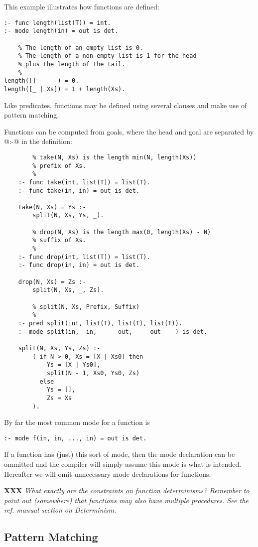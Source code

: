\documentclass[a4paper,11pt,notitlepage,onecolumn]{article}
\newcommand{\XXX}[1]%
{{\small\textbf{XXX} \emph{#1}}}
\begin{document}
This example illustrates how functions are defined:
\begin{verbatim}
:- func length(list(T)) = int.
:- mode length(in) = out is det.

    % The length of an empty list is 0.
    % The length of a non-empty list is 1 for the head
    % plus the length of the tail.
    %
length([]      ) = 0.
length([_ | Xs]) = 1 + length(Xs).
\end{verbatim}
Like predicates, functions may be defined using several clauses
and make use of pattern matching.

Functions can be computed from goals, where the head and goal
are separated by @:-@ in the definition:
\begin{verbatim}
        % take(N, Xs) is the length min(N, length(Xs))
        % prefix of Xs.
        %
    :- func take(int, list(T)) = list(T).
    :- func take(in, in) = out is det.

    take(N, Xs) = Ys :-
        split(N, Xs, Ys, _).

        % drop(N, Xs) is the length max(0, length(Xs) - N)
        % suffix of Xs.
        %
    :- func drop(int, list(T)) = list(T).
    :- func drop(in, in) = out is det.

    drop(N, Xs) = Zs :-
        split(N, Xs, _, Zs).

        % split(N, Xs, Prefix, Suffix)
        %
    :- pred split(int, list(T), list(T), list(T)).
    :- mode split(in,  in,      out,     out    ) is det.

    split(N, Xs, Ys, Zs) :-
        ( if N > 0, Xs = [X | Xs0] then
            Ys = [X | Ys0],
            split(N - 1, Xs0, Ys0, Zs)
          else
            Ys = [],
            Zs = Xs
        ).
\end{verbatim}
By far the most common mode for a function is
\begin{verbatim}
:- mode f(in, in, ..., in) = out is det.
\end{verbatim}

If a function has (just) this sort of mode, then the mode
declaration can be ommitted and the compiler will simply assume
this mode is what is intended.  Hereafter we will omit unnecessary
mode declarations for functions.

\XXX{What exactly are the constraints on function
determinisms?  Remember to point out (somewhere) that
functions may also have multiple procedures.  See the ref.
manual section on Determinism.}

\subsection{Pattern Matching}
\end{document}
